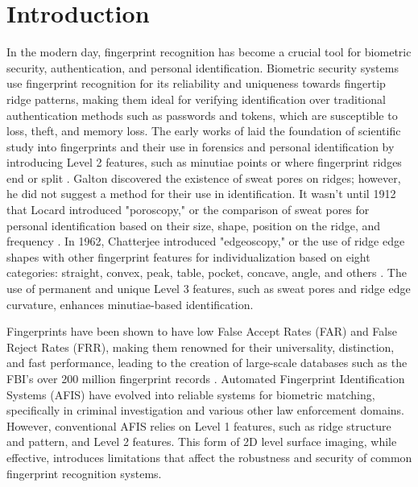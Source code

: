 \chapter{Introduction}

In the modern day, fingerprint recognition has become a crucial tool for biometric security, authentication, and personal identification. Biometric security systems use fingerprint recognition for its reliability and uniqueness towards fingertip ridge patterns, making them ideal for verifying identification over traditional authentication methods such as passwords and tokens, which are susceptible to loss, theft, and memory loss. The early works of \textcite{PersonalIdentificationDescription} laid the foundation of scientific study into fingerprints and their use in forensics and personal identification by introducing Level 2 features, such as minutiae points or where fingerprint ridges end or split \parencite{PersonalIdentificationDescription}. Galton discovered the existence of sweat pores on ridges; however, he did not suggest a method for their use in identification. It wasn't until 1912 that Locard introduced "poroscopy," or the comparison of sweat pores for personal identification based on their size, shape, position on the ridge, and frequency \parencite{locardLidentificationCriminelsPar1912}. In 1962, Chatterjee introduced "edgeoscopy," or the use of ridge edge shapes with other fingerprint features for individualization based on eight categories: straight, convex, peak, table, pocket, concave, angle, and others \parencite{ashbaughQuantitativequalitativeFrictionRidge1999}. The use of permanent and unique Level 3 features, such as sweat pores and ridge edge curvature, enhances minutiae-based identification.

Fingerprints have been shown to have low False Accept Rates (FAR) and False Reject Rates (FRR), making them renowned for their universality, distinction, and fast performance, leading to the creation of large-scale databases such as the FBI's over 200 million fingerprint records \parencite{chengArtificialFingerprintRecognition2006}. Automated Fingerprint Identification Systems (AFIS) have evolved into reliable systems for biometric matching, specifically in criminal investigation and various other law enforcement domains. However, conventional AFIS relies on Level 1 features, such as ridge structure and pattern, and Level 2 features. This form of 2D level surface imaging, while effective, introduces limitations that affect the robustness and security of common fingerprint recognition systems. 

